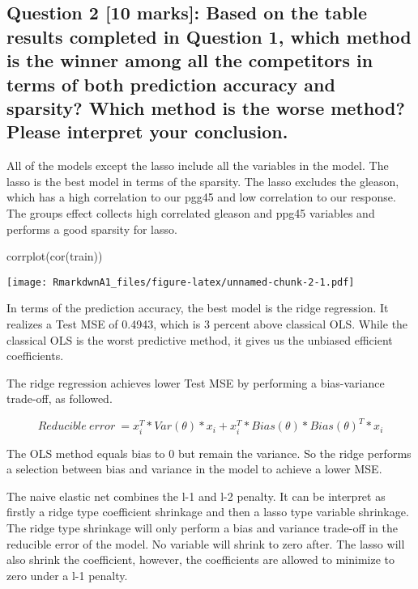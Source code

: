 \documentclass[
]{article}
\newenvironment{Shaded}{\begin{snugshade}}{\end{snugshade}}
\newcommand{\FunctionTok}[1]{\textcolor[rgb]{0.00,0.00,0.00}{#1}}
\newcommand{\NormalTok}[1]{#1}
\begin{document}
\hypertarget{question-2-10-marks-based-on-the-table-results-completed-in-question-1-which-method-is-the-winner-among-all-the-competitors-in-terms-of-both-prediction-accuracy-and-sparsity-which-method-is-the-worse-method-please-interpret-your-conclusion.}{%
\subsection{Question 2 {[}10 marks{]}: Based on the table results
completed in Question 1, which method is the winner among all the
competitors in terms of both prediction accuracy and sparsity? Which
method is the worse method? Please interpret your
conclusion.}\label{question-2-10-marks-based-on-the-table-results-completed-in-question-1-which-method-is-the-winner-among-all-the-competitors-in-terms-of-both-prediction-accuracy-and-sparsity-which-method-is-the-worse-method-please-interpret-your-conclusion.}}

All of the models except the lasso include all the variables in the
model. The lasso is the best model in terms of the sparsity. The lasso
excludes the gleason, which has a high correlation to our pgg45 and low
correlation to our response. The groups effect collects high correlated
gleason and ppg45 variables and performs a good sparsity for lasso.

\begin{Shaded}
\begin{Highlighting}[]
\FunctionTok{corrplot}\NormalTok{(}\FunctionTok{cor}\NormalTok{(train))}
\end{Highlighting}
\end{Shaded}

\texttt{[image: RmarkdwnA1\_files/figure-latex/unnamed-chunk-2-1.pdf]}

In terms of the prediction accuracy, the best model is the ridge
regression. It realizes a Test MSE of 0.4943, which is 3 percent above
classical OLS. While the classical OLS is the worst predictive method,
it gives us the unbiased efficient coefficients.

The ridge regression achieves lower Test MSE by performing a
bias-variance trade-off, as followed.

\[
Reducible\ error\ = x_i^T*Var(\theta)*x_i+x_i^T*Bias(\theta)*Bias(\theta)^T*x_i
\]

The OLS method equals bias to 0 but remain the variance. So the ridge
performs a selection between bias and variance in the model to achieve a
lower MSE.

The naive elastic net combines the l-1 and l-2 penalty. It can be
interpret as firstly a ridge type coefficient shrinkage and then a lasso
type variable shrinkage. The ridge type shrinkage will only perform a
bias and variance trade-off in the reducible error of the model. No
variable will shrink to zero after. The lasso will also shrink the
coefficient, however, the coefficients are allowed to minimize to zero
under a l-1 penalty.
\end{document}

